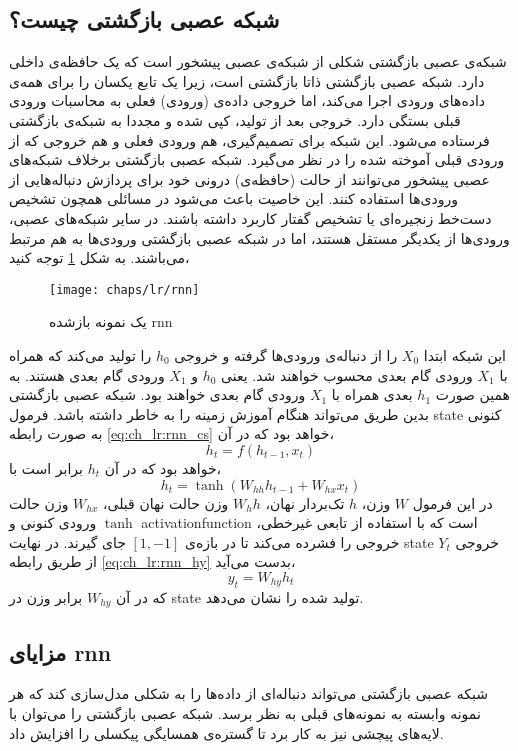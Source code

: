 \subsection{شبکه عصبی بازگشتی چیست؟}
 شبکه‌ی عصبی بازگشتی شکلی از شبکه‌ی عصبی پیشخور است که یک حافظه‌ی داخلی دارد. شبکه عصبی بازگشتی ذاتا بازگشتی است، زیرا یک تابع یکسان را برای همه‌ی داده‌های ورودی اجرا می‌کند، اما خروجی داده‌ی (ورودی) فعلی به محاسبات ورودی قبلی بستگی دارد. خروجی بعد از تولید، کپی شده و مجددا به شبکه‌ی بازگشتی فرستاده می‌شود. این شبکه برای تصمیم‌گیری، هم ورودی فعلی و هم خروجی که از ورودی قبلی آموخته شده را در نظر می‌گیرد.
 شبکه عصبی بازگشتی برخلاف شبکه‌های عصبی پیشخور می‌توانند از حالت (حافظه‌ی) درونی خود برای پردازش دنباله‌هایی از ورودی‌ها استفاده کنند. این خاصیت باعث می‌شود در مسائلی همچون تشخیص دست‌خط زنجیره‌ای یا تشخیص گفتار کاربرد داشته باشند. در سایر شبکه‌های عصبی، ورودی‌ها از یکدیگر مستقل هستند، اما در شبکه عصبی بازگشتی ورودی‌ها به هم مرتبط می‌باشند. به شکل \ref{fig:ch_lr:rnn} توجه کنید،
 \begin{figure}[!ht]
 	\centerline{\texttt{[image: chaps/lr/rnn]}}
 	\caption{
 		یک نمونه بازشده \gls{rnn}
 	}
 	\label{fig:ch_lr:rnn}
 \end{figure}
 این شبکه ابتدا $X_0$ را از دنباله‌ی ورودی‌ها گرفته و خروجی $h_0$ را تولید می‌کند که همراه با $X_1$ ورودی گام بعدی محسوب خواهند شد. یعنی $h_0$ و $X_1$ ورودی گام بعدی هستند. به همین صورت $h_1$ بعدی همراه با $X_1$ ورودی گام بعدی خواهند بود. شبکه عصبی بازگشتی بدین طریق می‌تواند هنگام آموزش زمینه را به خاطر داشته باشد.
 فرمول \gls{state} کنونی به صورت رابطه \ref{eq:ch_lr:rnn_cs} خواهد بود که در آن،
 \begin{equation}
 	h_t = f(h_{t-1}, x_t)
 	\label{eq:ch_lr:rnn_cs}
 \end{equation}
 خواهد بود که در آن $h_t$ برابر است با،
 \begin{equation}
 	h_t = \tanh(W_{hh}h_{t-1} + W_{hx}x_t)
 	\label{eq:ch_lr:rnn_ht}
 \end{equation}
 در این فرمول $W$ وزن، $h$ تک‌بردار نهان، $W_hh$ وزن حالت نهان قبلی، $W_{hx}$ وزن حالت ورودی کنونی و $\tanh$ \gls{activationfunction} است که با استفاده از تابعی غیرخطی، خروجی را فشرده می‌کند تا در بازه‌ی $[1, -1]$ جای گیرند. در نهایت \gls{state} خروجی $Y_t$ از طریق رابطه \ref{eq:ch_lr:rnn_hy} بدست می‌آید،
 \begin{equation}
 	y_t = W_{hy}h_t
 	\label{eq:ch_lr:rnn_hy}
 \end{equation}
 که در آن $W_{hy}$ برابر وزن در \gls{state} تولید شده را نشان می‌دهد.
 
 \subsection{مزایای \gls{rnn}}
 شبکه عصبی بازگشتی می‌تواند دنباله‌ای از داده‌ها را به شکلی مدل‌سازی کند که هر نمونه وابسته به نمونه‌های قبلی به نظر برسد. شبکه عصبی بازگشتی را می‌توان با لایه‌های پیچشی نیز به کار برد تا گستره‌ی همسایگی پیکسلی را افزایش داد.
 

